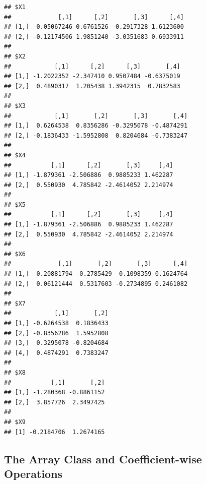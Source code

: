 \documentclass[]{book}
\begin{document}
\begin{verbatim}
## $X1
##             [,1]      [,2]       [,3]      [,4]
## [1,] -0.05067246 0.6761526 -0.2917328 1.6123600
## [2,] -0.12174506 1.9851240 -3.0351683 0.6933911
## 
## $X2
##            [,1]      [,2]      [,3]       [,4]
## [1,] -1.2022352 -2.347410 0.9507484 -0.6375019
## [2,]  0.4890317  1.205438 1.3942315  0.7832583
## 
## $X3
##            [,1]       [,2]       [,3]       [,4]
## [1,]  0.6264538  0.8356286 -0.3295078 -0.4874291
## [2,] -0.1836433 -1.5952808  0.8204684 -0.7383247
## 
## $X4
##           [,1]      [,2]       [,3]     [,4]
## [1,] -1.879361 -2.506886  0.9885233 1.462287
## [2,]  0.550930  4.785842 -2.4614052 2.214974
## 
## $X5
##           [,1]      [,2]       [,3]     [,4]
## [1,] -1.879361 -2.506886  0.9885233 1.462287
## [2,]  0.550930  4.785842 -2.4614052 2.214974
## 
## $X6
##             [,1]       [,2]       [,3]      [,4]
## [1,] -0.20881794 -0.2785429  0.1098359 0.1624764
## [2,]  0.06121444  0.5317603 -0.2734895 0.2461082
## 
## $X7
##            [,1]       [,2]
## [1,] -0.6264538  0.1836433
## [2,] -0.8356286  1.5952808
## [3,]  0.3295078 -0.8204684
## [4,]  0.4874291  0.7383247
## 
## $X8
##           [,1]       [,2]
## [1,] -1.280368 -0.8861152
## [2,]  3.857726  2.3497425
## 
## $X9
## [1] -0.2184706  1.2674165
\end{verbatim}

\subsection{The Array Class and Coefficient-wise
Operations}\label{the-array-class-and-coefficient-wise-operations}
\end{document}
